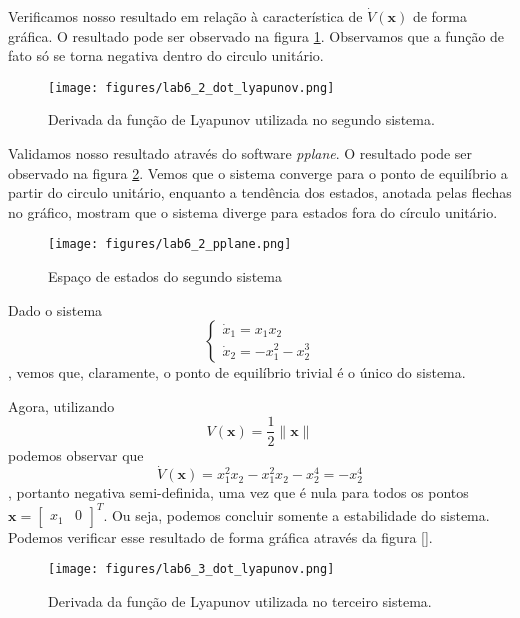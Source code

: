 \documentclass[a4paper]{report}
\begin{document}
Verificamos nosso resultado em relação à característica de $\dot{V}\left( \bm{x} \right) $ de forma gráfica. O resultado pode ser observado na figura \ref{fig:figures-lab6_2_dot_lyapunov-png}. Observamos que a função de fato só se torna negativa dentro do circulo unitário.

\begin{figure}[H]
    \centering
    \texttt{[image: figures/lab6\_2\_dot\_lyapunov.png]}
    \caption{Derivada da função de Lyapunov utilizada no segundo sistema.}
    \label{fig:figures-lab6_2_dot_lyapunov-png}
\end{figure}

Validamos nosso resultado através do software \emph{pplane}. O resultado pode ser observado na figura \ref{fig:figures-lab6_2_pplane-png}. Vemos que o sistema converge para o ponto de equilíbrio a partir do circulo unitário, enquanto a tendência dos estados, anotada pelas flechas no gráfico, mostram que o sistema diverge para estados fora do círculo unitário.

\begin{figure}[H]
    \centering
    \texttt{[image: figures/lab6\_2\_pplane.png]}
    \caption{Espaço de estados do segundo sistema}
    \label{fig:figures-lab6_2_pplane-png}
\end{figure}


Dado o sistema \[
\begin{cases}
    \dot{x}_1 = x_1x_2 \\
    \dot{x}_2 = -x_1^2 - x_2^{3}
\end{cases}
\], vemos que, claramente, o ponto de equilíbrio trivial é o único do sistema.

Agora, utilizando \[
    V\left( \bm{x} \right) = \frac{1}{2}\|\bm{x}\|
\] podemos observar que \[
\dot{V}\left( \bm{x} \right) = x_1^2x_2 - x_1^2x_2-x_2^{4} = - x_2^{4}
\], portanto negativa semi-definida, uma vez que é nula para todos os pontos $\bm{x} = \begin{bmatrix} x_1 & 0 \end{bmatrix}^{T}$. Ou seja, podemos concluir somente a estabilidade do sistema. Podemos verificar esse resultado de forma gráfica através da figura \ref{}.

\begin{figure}[H]
    \centering
    \texttt{[image: figures/lab6\_3\_dot\_lyapunov.png]}
    \caption{Derivada da função de Lyapunov utilizada no terceiro sistema.}
    \label{fig:figures-lab6_3_dot_lyapunov-png}
\end{figure}
\end{document}
